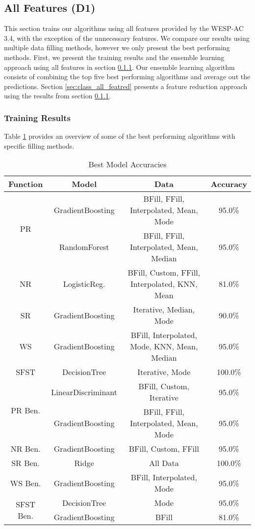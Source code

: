\documentclass[12pt,letterpaper]{article}
\begin{document}
\subsection{All Features (D1)}\label{sec:class_all}
This section trains our algorithms using all features provided by the WESP-AC 3.4, with the exception of the unnecessary features.
We compare our results using multiple data filling methods, however we only present the best performing methods.
First, we present the training results and the ensemble learning approach using all features in section \ref{sec:class_all_results}.
Our ensemble learning algorithm consists of combining the top five best performing algorithms and average out the predictions.
Section \ref{sec:class_all_featred} presents a feature reduction approach using the results from section \ref{sec:class_all_results}.

\subsubsection{Training Results}\label{sec:class_all_results}
Table \ref{tab_class_all:model_accuracies_best} provides an overview of some of the best performing algorithms with specific filling methods.


\begin{table}[H]
\centering
\begin{tabular}{|c|c|c|c|}
\hline
\textbf{Function} & \textbf{Model} & \textbf{Data} & \textbf{Accuracy} \\
\hline
\multirow{2}{*}{PR} & GradientBoosting & BFill, FFill, Interpolated, Mean, Mode & 95.0\% \\
 & RandomForest & BFill, FFill, Interpolated, Mean, Median & 95.0\% \\
\hline
NR    & LogisticReg. & BFill, Custom, FFill, Interpolated, KNN, Mean & 81.0\% \\
\hline
SR    & GradientBoosting & Iterative, Median, Mode & 90.0\% \\
\hline
WS    & GradientBoosting & BFill, Interpolated, Mode, KNN, Mean, Median & 95.0\% \\
\hline
SFST  & DecisionTree & Iterative, Mode & 100.0\% \\
\hline
\multirow{2}{*}{PR Ben.} & LinearDiscriminant & BFill, Custom, Iterative & 95.0\% \\
 & GradientBoosting & BFill, FFill, Interpolated, Mean, Mode & 95.0\% \\
\hline
NR Ben. & GradientBoosting & BFill, Custom, FFill & 95.0\% \\
\hline
SR Ben.& Ridge& All Data & 100.0\% \\
\hline
WS Ben. & GradientBoosting & BFill, Interpolated, Mode & 95.0\% \\
\hline
\multirow{2}{*}{SFST Ben.} & DecisionTree & Mode & 95.0\% \\
 & GradientBoosting & BFill & 81.0\% \\
\hline
\end{tabular}
\caption{Best Model Accuracies}
\label{tab_class_all:model_accuracies_best}
\end{table}
\end{document}

